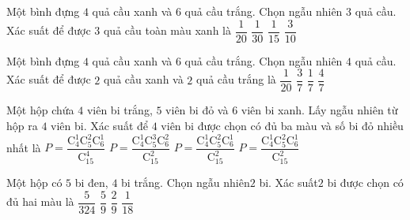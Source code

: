 \begin{ex}
Một bình đựng $4$ quả cầu xanh và $6$ quả cầu trắng. Chọn ngẫu nhiên $3$ quả cầu. Xác suất để được $3$ quả cầu toàn màu xanh là
\choice
{$\dfrac{1}{20}$}
{\True $\dfrac{1}{30}$}
{$\dfrac{1}{15}$}
{$\dfrac{3}{10}$}
\end{ex}
\begin{ex}
Một bình đựng $4$ quả cầu xanh và $6$ quả cầu trắng. Chọn ngẫu nhiên $4$ quả cầu. Xác suất để được $2$ quả cầu xanh và $2$ quả cầu trắng là
\choice
{$\dfrac{1}{20}$}
{\True $\dfrac{3}{7}$}
{$\dfrac{1}{7}$}
{$\dfrac{4}{7}$}
\end{ex}
\begin{ex}
Một hộp chứa $4$ viên bi trắng, $5$ viên bi đỏ và $6$ viên bi xanh. Lấy ngẫu nhiên từ hộp ra $4$ viên bi. Xác suất để $4$ viên bi được chọn có đủ ba màu và số bi đỏ nhiều nhất là
\choice
{\True $P=\dfrac{\mathrm{C}_4^1\mathrm{C}_5^2\mathrm{C}_6^1}{\mathrm{C}_{15}^4}$}
{$P=\dfrac{\mathrm{C}_4^1\mathrm{C}_5^3\mathrm{C}_6^2}{\mathrm{C}_{15}^2}$}
{$P=\dfrac{\mathrm{C}_4^1\mathrm{C}_5^2\mathrm{C}_6^1}{\mathrm{C}_{15}^2}$}
{$P=\dfrac{\mathrm{C}_4^1\mathrm{C}_5^2\mathrm{C}_6^1}{\mathrm{C}_{15}^2}$}
\end{ex}
\begin{ex}
Một hộp có $5$ bi đen, $4$ bi trắng. Chọn ngẫu nhiên$2$ bi. Xác suất$2$ bi được chọn có đủ hai màu là
\choice
{$\dfrac{5}{324}$}
{\True $\dfrac{5}{9}$}
{$\dfrac{2}{9}$}
{$\dfrac{1}{18}$}
\end{ex}
